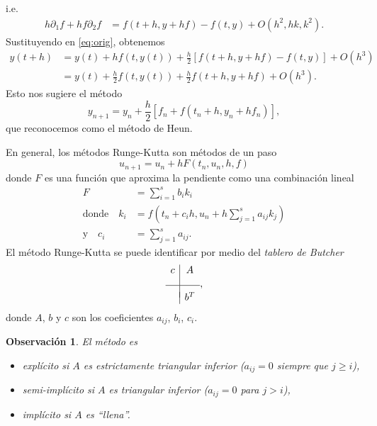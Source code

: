 \documentclass[11pt,letterpaper]{report}
\newtheorem{remark}{Observación}
\begin{document}
i.e.
\begin{align}
  h \partial _1 f + hf \partial _2 f
  &=
  f(t+h,y+hf) - f(t,y)
  + O(h^{2},hk,k^{2}).
\end{align}
Sustituyendo en \eqref{eq:orig}, obtenemos
\begin{align}\label{eq:sust}
  y(t+h)
  &= y(t)
    + hf(t,y(t))
    + \frac{h}{2}
    \left[
    f(t+h,y+hf) - f(t,y)
    \right]
    + O(h^{3})
  \\
  &= y(t)
    + \frac{h}{2} f(t,y(t))
    + \frac{h}{2} f(t+h,y+hf)
    + O(h^{3})
.\end{align}
Esto nos sugiere el método
\begin{equation}
  y_{n+1} = y_n + \frac{h}{2} \left[
    f_n + f(t_n + h, y_n + hf_n)
  \right]
,\end{equation}
que reconocemos como el método de Heun.

En general, los métodos Runge-Kutta son métodos de un paso
\begin{equation}
  u_{n+1} = u_n + h F(t_n,u_n,h,f)
\end{equation}
donde $F$ es una función que aproxima la pendiente como una
combinación lineal
\begin{align}
  F
    &=
    \sum_{i=1}^{s}b_ik_i
  \\[-3mm]
  \text{donde} \quad
  k_i
    &= f(t_n+c_ih, u_n+h \sum_{j=1}^{s}a_{ij} k_j)
    \\[-4mm]
  \text{y} \quad
  c_i
    &= \sum_{j=1}^{s}a_{ij}
.\end{align}
El método Runge-Kutta  se puede identificar por medio del
\emph{tablero de Butcher}
\begin{equation}
  \begin{array}{c|c}
    c & A \\[3mm]
    \hline \\[-2mm]
      & b^{T}
  \end{array}
,\end{equation}
donde $A$, $b$ y $c$ son los coeficientes $a_{ij}$, $b_i$, $c_i$.

\begin{remark}
  El método es
  \begin{itemize}
    \item
      explícito si $A$ es estrictamente triangular inferior
      ($a_{ij}=0$ siempre que $j\geq i$),
    \item
      semi-implícito si $A$ es triangular inferior ($a_{ij}=0$ para
      $j>i$),
    \item
      implícito si $A$ es ``llena''.
  \end{itemize}
\end{remark}
\end{document}

